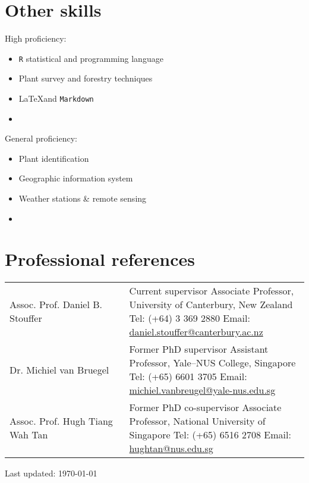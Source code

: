 \documentclass[a4paper]{article}
\def\footerlink{}
\begin{document}
\section*{Other skills}
\begin{multicols}{2}
High proficiency:
\begin{itemize}
	\item \texttt{R} statistical and programming language
	\item Plant survey and forestry techniques
	\item \LaTeX and \texttt{Markdown}
	\item 
\end{itemize}
\columnbreak
General proficiency:
\begin{itemize}
	\item Plant identification 
	\item Geographic information system
	\item Weather stations \& remote sensing
	\item 
\end{itemize}
\end{multicols}


\section*{Professional references}
\begin{tabular}{p{0.4\linewidth} p{0.6\linewidth}}
Assoc. Prof. Daniel B. Stouffer & Current supervisor \newline Associate Professor, University of Canterbury, New Zealand \newline Tel: (+64) 3 369 2880 \newline Email: \url{daniel.stouffer@canterbury.ac.nz} \\
Dr. Michiel van Bruegel & Former PhD supervisor \newline Assistant Professor, Yale--NUS College, Singapore \newline Tel: (+65) 6601 3705 \newline Email: \url{michiel.vanbreugel@yale-nus.edu.sg} \\
Assoc. Prof. Hugh Tiang Wah Tan & Former PhD co-supervisor \newline Associate Professor, National University of Singapore \newline Tel: (+65) 6516 2708 \newline Email: \url{hughtan@nus.edu.sg} \\
\end{tabular}

\vfill

\begin{center}
  \begin{footnotesize}
    Last updated: \today \\
    \href{\footerlink}{\texttt{\footerlink}}
  \end{footnotesize}
\end{center}
\end{document}
